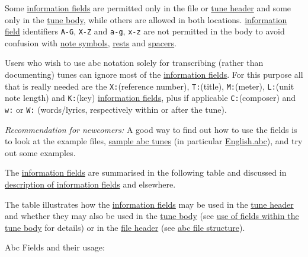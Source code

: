 Some \protect\hyperlink{information_field_definition}{information
fields} are permitted only in the file or
\protect\hyperlink{tune_header_definition}{tune header} and some only in
the \protect\hyperlink{tune_body_definition}{tune body}, while others
are allowed in both locations.
\protect\hyperlink{information_field_definition}{information field}
identifiers \texttt{A-G}, \texttt{X-Z} and \texttt{a-g}, \texttt{x-z}
are not permitted in the body to avoid confusion with
\protect\hyperlink{pitch}{note symbols},
\protect\hyperlink{rests}{rests} and
\protect\hyperlink{typesetting_extra_space}{spacers}.

Users who wish to use abc notation solely for transcribing (rather than
documenting) tunes can ignore most of the
\protect\hyperlink{information_field_definition}{information fields}.
For this purpose all that is really needed are the \texttt{X:}(reference
number), \texttt{T:}(title), \texttt{M:}(meter), \texttt{L:}(unit note
length) and \texttt{K:}(key)
\protect\hyperlink{information_field_definition}{information fields},
plus if applicable \texttt{C:}(composer) and \texttt{w:} or \texttt{W:}
(words/lyrics, respectively within or after the tune).

\emph{Recommendation for newcomers:} A good way to find out how to use
the fields is to look at the example files,
\protect\hyperlink{sample_abc_tunes}{sample abc tunes} (in particular
\protect\hyperlink{englishabc}{English.abc}), and try out some examples.

The \protect\hyperlink{information_field_definition}{information fields}
are summarised in the following table and discussed in
\protect\hyperlink{description_of_information_fields}{description of
information fields} and elsewhere.

The table illustrates how the
\protect\hyperlink{information_field_definition}{information fields} may
be used in the \protect\hyperlink{tune_header_definition}{tune header}
and whether they may also be used in the
\protect\hyperlink{tune_body_definition}{tune body} (see
\protect\hyperlink{use_of_fields_within_the_tune_body}{use of fields
within the tune body} for details) or in the
\protect\hyperlink{file_header_definition}{file header} (see
\protect\hyperlink{abc_file_structure}{abc file structure}).

Abc Fields and their usage:

